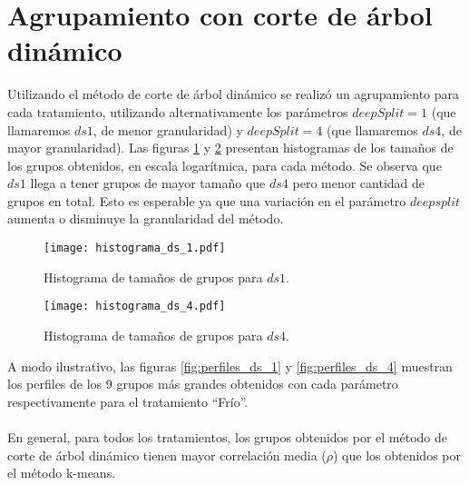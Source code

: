 \section{Agrupamiento con corte de árbol dinámico}
Utilizando el método de corte de árbol dinámico se realizó un agrupamiento para cada tratamiento, utilizando alternativamente los parámetros $deepSplit=1$ (que llamaremos $ds1$, de menor granularidad) y $deepSplit=4$ (que llamaremos $ds4$, de mayor granularidad). Las figuras \ref{fig:histograma_ds_1} y \ref{fig:histograma_ds_4} presentan histogramas de los tamaños de los grupos obtenidos, en escala logarítmica, para cada método. Se observa que $ds1$ llega a tener grupos de mayor tamaño que $ds4$ pero menor cantidad de grupos en total. Esto es esperable ya que una variación en el parámetro $deepsplit$ aumenta o disminuye la granularidad del método.\\
\begin{sidewaysfigure}[H]
    \centering
    \begin{subfigure}[t]{0.45\textwidth}
    \centering
    \texttt{[image: histograma\_ds\_1.pdf]}
    \caption{Histograma de tamaños de grupos para $ds1$.}
    \label{fig:histograma_ds_1}
    \end{subfigure}
    \begin{subfigure}[t]{0.45\textwidth}
    \centering
    \texttt{[image: histograma\_ds\_4.pdf]}
    \caption{Histograma de tamaños de grupos para $ds4$.}
    \label{fig:histograma_ds_4}
    \end{subfigure}
    \caption{Histogramas de tamaños de grupos en escala logarítmica para todos los tratamientos. En el panel de la izquierda, los grupos obtenidos con $ds1$ y en el de la derecha, con $ds4$. $ds1$ presenta una mayor cantidad de grupos que $ds4$.}
\end{sidewaysfigure}
A modo ilustrativo, las figuras \ref{fig:perfiles_ds_1} y \ref{fig:perfiles_ds_4} muestran los perfiles de los 9 grupos más grandes obtenidos con cada parámetro respectivamente para el tratamiento ``Frío''.\\\\ 
En general, para todos los tratamientos, los grupos obtenidos por el método de corte de árbol dinámico tienen mayor correlación media ($\rho$) que los obtenidos por el método k-means.\\\\
